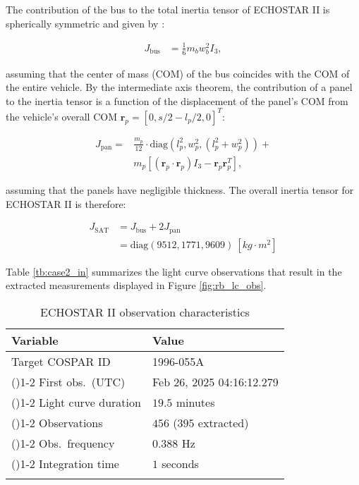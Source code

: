 \documentclass[a4paper,twocolumn]{spaceDebrisC} %
\newcommand{\grule}[0]{\arrayrulecolor{darkgray}\cmidrule(){1-2}}
\newcommand{\brule}[0]{\arrayrulecolor{black} \bottomrule}
\newcommand{\vctr}[1]{\bm{#1}}
\begin{document}
The contribution of the bus to the total inertia tensor of ECHOSTAR II is spherically symmetric and given by \cite{satterly1958}:

\begin{align}
 J_\text{bus} &= \frac{1}{6} m_b w_b^2 I_3,
\end{align}

\noindent
assuming that the center of mass (COM) of the bus coincides with the COM of the entire vehicle. By the intermediate axis theorem, the contribution of a panel to the inertia tensor is a function of the displacement of the panel's COM from the vehicle's overall COM $\vctr{r}_p = [ 0, s/2 - l_p/2, 0]^T$:

\begin{equation}
  \begin{split}
 J_\text{pan} = &\frac{m_p}{12} \cdot \text{diag}\left(l_p^2, w_p^2, \left(l_p^2 + w_p^2\right) \right) + \\&m_p \left[ \left( \vctr{r}_p \cdot \vctr{r}_p \right) I_3 - \vctr{r}_p \vctr{r}_p^T \right],
  \end{split}
\end{equation}

\noindent
assuming that the panels have negligible thickness. The overall inertia tensor for ECHOSTAR II is therefore:

\begin{align}
 J_\text{SAT} &= J_\text{bus} + 2J_\text{pan} \\
  &= \text{diag} \left( 9512, 1771, 9609 \right) \: [kg \cdot m^2]
\end{align}

Table \ref{tb:case2_in} summarizes the light curve observations that result in the extracted measurements displayed in Figure \ref{fig:rb_lc_obs}.

\begin{table}[H]
  \centering
  \renewcommand{\arraystretch}{1.2} 
  \caption{ECHOSTAR II observation characteristics}
  \vspace*{6pt}
  \begin{tabular}{@{} l l @{}}
    \toprule
 Variable & Value \\ \midrule
 Target COSPAR ID & 1996-055A \\ \grule
 First obs.\ (UTC) & Feb 26, 2025 04:16:12.279 \\ \grule
 Light curve duration & $19.5$ minutes \\ \grule
 Observations & $456$ ($395$ extracted) \\ \grule
 Obs.\ frequency & $0.388$ Hz \\ \grule
 Integration time & $1$ seconds \\ \brule
  \end{tabular}
  \label{tb:case3_in}
\end{table}
\end{document}

